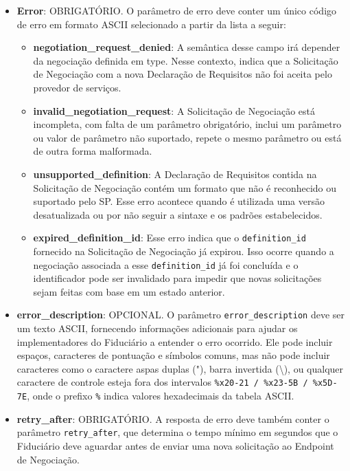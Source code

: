 \begin{itemize}

    \item \textbf{Error}: OBRIGATÓRIO. O parâmetro de erro deve conter um único código de erro em formato ASCII selecionado a partir da lista a seguir:

    \begin{itemize}
    
        \item \textbf{negotiation\_request\_denied}: A semântica desse campo irá depender da negociação definida em type. Nesse contexto, indica que a Solicitação de Negociação com a nova Declaração de Requisitos não foi aceita pelo provedor de serviços.

        \item \textbf{invalid\_negotiation\_request}: A Solicitação de Negociação está incompleta, com falta de um parâmetro obrigatório, inclui um parâmetro ou valor de parâmetro não suportado, repete o mesmo parâmetro ou está de outra forma malformada.

        \item \textbf{unsupported\_definition}: A Declaração de Requisitos contida na Solicitação de Negociação contém um formato que não é reconhecido ou suportado pelo \acs{SP}. Esse erro acontece quando é utilizada uma versão desatualizada ou por não seguir a sintaxe e os padrões estabelecidos.

        \item \textbf{expired\_definition\_id}: Esse erro indica que o \texttt{definition\_id} fornecido na Solicitação de Negociação já expirou. Isso ocorre quando a negociação associada a esse \texttt{definition\_id} já foi concluída e o identificador pode ser invalidado para impedir que novas solicitações sejam feitas com base em um estado anterior.
        
    \end{itemize}

    \item \textbf{error\_description}: OPCIONAL. O parâmetro \texttt{error\_description} deve ser um texto ASCII, fornecendo informações adicionais para ajudar os implementadores do Fiduciário a entender o erro ocorrido. Ele pode incluir espaços, caracteres de pontuação e símbolos comuns, mas não pode incluir caracteres como o caractere aspas duplas ("), barra invertida (\textbackslash), ou qualquer caractere de controle esteja fora dos intervalos \texttt{\%x20-21 / \%x23-5B / \%x5D-7E}, onde o prefixo \texttt{\%} indica valores hexadecimais da tabela ASCII.

    \item \textbf{retry\_after}: OBRIGATÓRIO. A resposta de erro deve também conter o parâmetro \texttt{retry\_after}, que determina o tempo mínimo em segundos que o Fiduciário deve aguardar antes de enviar uma nova solicitação ao Endpoint de Negociação.
    
\end{itemize}


